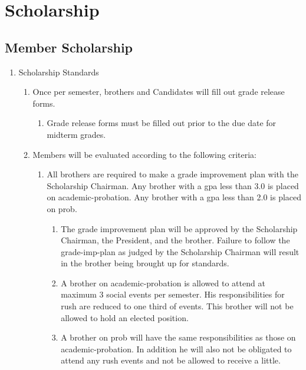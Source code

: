 \chapter{Scholarship}


\section{Member Scholarship}
	\label{member-schol-stds}
	\begin{enumerate}

	\item Scholarship Standards
		\begin{enumerate}
			\item Once per semester, brothers and Candidates will fill out grade release forms.
			\begin{enumerate}
				\item Grade release forms must be filled out prior to the due date for midterm grades.
			\end{enumerate}

			\item Members will be evaluated according to the following criteria:\label{academic-probation}	
			\begin{enumerate}
				\item All brothers are required to make a  grade improvement plan with the Scholarship Chairman. Any brother with a  \gls{gpa} less than 3.0 is placed on \gls{academic-probation}. Any brother with a \gls{gpa} less than 2.0 is placed on \gls{prob}.
				
				\begin{enumerate}
					\item The grade improvement plan will be approved by the Scholarship Chairman, the President, and the brother. Failure to follow the \gls{grade-imp-plan} as judged by the Scholarship Chairman will result in the brother being brought up for standards.
					\label{academic-watch} 
					
					\item A brother on \gls{academic-probation} is allowed to attend at maximum 3 social events per semester. His responsibilities for rush are reduced to one third of events. This brother will not be allowed to hold an elected position. \label{officer-eligibility}
					\label{academic-probation} 
					
					\item A brother on \gls{prob} will have the same responsibilities as those on \gls{academic-probation}.  In addition he will also not be obligated to attend any rush events and not be allowed to receive a little.
				\end{enumerate}


\end{enumerate}
\end{enumerate}
\end{enumerate}
